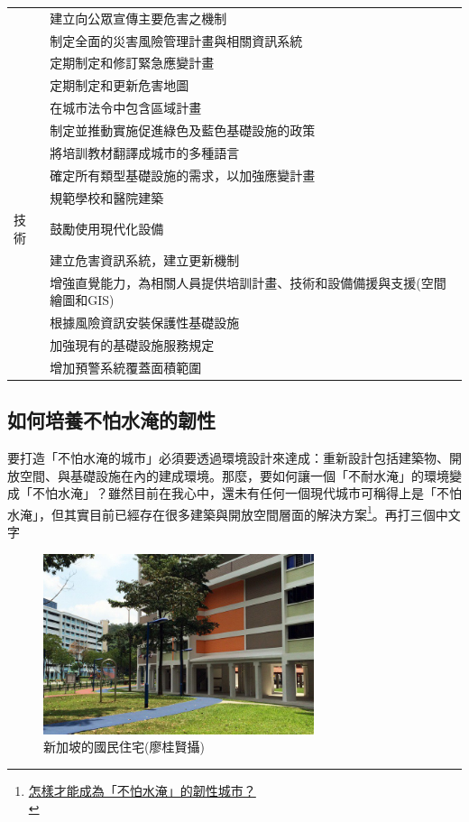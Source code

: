 \documentclass[a4paper,12pt]{article}
\begin{document}
\begin{center}
\begin{tabular}{ll}
 & 建立向公眾宣傳主要危害之機制\\
 & 制定全面的災害風險管理計畫與相關資訊系統\\
 & 定期制定和修訂緊急應變計畫\\
 & 定期制定和更新危害地圖\\
 & 在城市法令中包含區域計畫\\
 & 制定並推動實施促進綠色及藍色基礎設施的政策\\
 & 將培訓教材翻譯成城市的多種語言\\
 & 確定所有類型基礎設施的需求，以加強應變計畫\\
 & 規範學校和醫院建築\\
\hline
技術 & 鼓勵使用現代化設備\\
 & 建立危害資訊系統，建立更新機制\\
 & 增強直覺能力，為相關人員提供培訓計畫、技術和設備備援與支援(空間繪圖和GIS)\\
 & 根據風險資訊安裝保護性基礎設施\\
 & 加強現有的基礎設施服務規定\\
 & 增加預警系統覆蓋面積範圍\\
\hline
\end{tabular}
\end{center}

\subsection{如何培養不怕水淹的韌性}
\label{sec:orge6cce82}
要打造「不怕水淹的城市」必須要透過環境設計來達成：重新設計包括建築物、開放空間、與基礎設施在內的建成環境。那麼，要如何讓一個「不耐水淹」的環境變成「不怕水淹」？雖然目前在我心中，還未有任何一個現代城市可稱得上是「不怕水淹」，但其實目前已經存在很多建築與開放空間層面的解決方案\footnote{\href{https://opinion.udn.com/opinion/story/8048/2501992}{怎樣才能成為「不怕水淹」的韌性城市？}\\\label{org1d50b66}}。再打三個中文字\\

\begin{figure}[htbp]
\centering
\includegraphics[width=300]{images/161236830052927_P3592718.jpg}
\caption{\label{fig:FigName}新加坡的國民住宅(廖桂賢攝)}
\end{figure}
\end{document}
